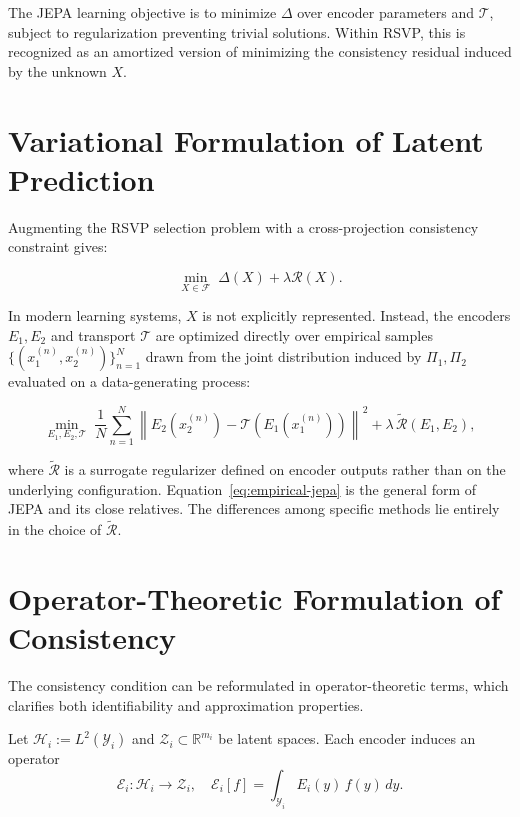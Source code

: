 \documentclass[12pt, oneside]{article}
\begin{document}
The JEPA learning objective is to minimize $\Delta$ over encoder parameters and $\mathcal{T}$, subject to regularization preventing trivial solutions. Within RSVP, this is recognized as an amortized version of minimizing the consistency residual induced by the unknown $X$.

\section{Variational Formulation of Latent Prediction}
\label{sec:variational}

Augmenting the RSVP selection problem with a cross-projection consistency constraint gives:

\begin{equation}
\label{eq:rsvp-jepa}
\min_{X \in \mathcal{F}} \; \Delta(X) + \lambda \mathcal{R}(X).
\end{equation}

In modern learning systems, $X$ is not explicitly represented. Instead, the encoders $E_1, E_2$ and transport $\mathcal{T}$ are optimized directly over empirical samples $\{(x_1^{(n)}, x_2^{(n)})\}_{n=1}^N$ drawn from the joint distribution induced by $\Pi_1, \Pi_2$ evaluated on a data-generating process:

\begin{equation}
\label{eq:empirical-jepa}
\min_{E_1, E_2, \mathcal{T}} \; \frac{1}{N}\sum_{n=1}^N
\left\| E_2(x_2^{(n)}) - \mathcal{T}(E_1(x_1^{(n)})) \right\|^2
+ \lambda \,\widetilde{\mathcal{R}}(E_1, E_2),
\end{equation}

where $\widetilde{\mathcal{R}}$ is a surrogate regularizer defined on encoder outputs rather than on the underlying configuration. Equation~\eqref{eq:empirical-jepa} is the general form of JEPA and its close relatives. The differences among specific methods lie entirely in the choice of $\widetilde{\mathcal{R}}$.

\section{Operator-Theoretic Formulation of Consistency}
\label{sec:formulation}

The consistency condition can be reformulated in operator-theoretic terms, which clarifies both identifiability and approximation properties.

Let $\mathcal{H}_i := L^2(\mathcal{Y}_i)$ and $\mathcal{Z}_i \subset \mathbb{R}^{m_i}$ be latent spaces. Each encoder induces an operator
\[
\mathcal{E}_i : \mathcal{H}_i \to \mathcal{Z}_i,
\quad
\mathcal{E}_i[f] = \int_{\mathcal{Y}_i} E_i(y)\, f(y)\, dy.
\]
\end{document}
